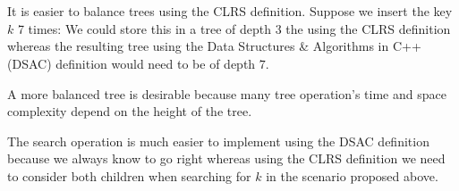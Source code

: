 \documentclass[12pt, a4paper]{article}
\begin{document}
\section{} %
It is easier to balance trees using the CLRS definition. Suppose we insert the key $k$ 7 times: We could store this in a tree of depth $3$ the using the CLRS definition whereas the resulting tree using the Data Structures \& Algorithms in C++ (DSAC) definition would need to be of depth $7$.

A more balanced tree is desirable because many tree operation's time and space complexity depend on the height of the tree.

The search operation is much easier to implement using the DSAC definition because we always know to go right whereas using the CLRS definition we need to consider both children when searching for $k$ in the scenario proposed above.

\section{} %
\end{document}
